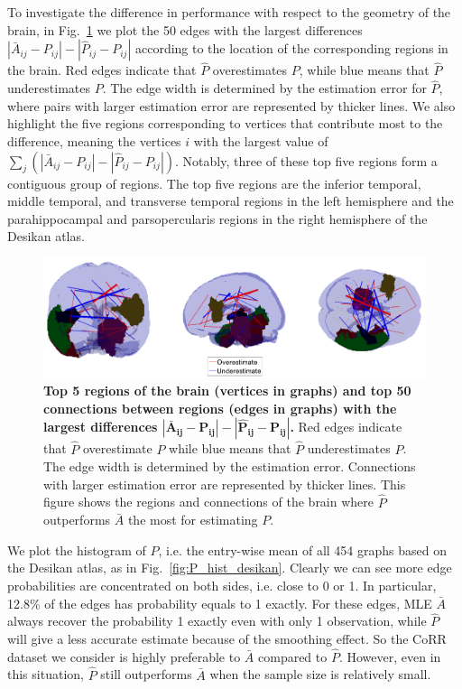 \documentclass[10pt,letterpaper]{article}
\renewcommand{\hat}{\widehat}
\begin{document}
To investigate the difference in performance with respect to the geometry of the brain, in Fig.~\ref{fig:Diff_between_desikan} we plot the 50 edges with the largest differences $|\bar{A}_{ij} - P_{ij}| - |\hat{P}_{ij} - P_{ij}|$ according to the location of the corresponding regions in the brain. Red edges indicate that $\hat{P}$ overestimates $P$, while blue means that $\hat{P}$ underestimates $P$. The edge width is determined by the estimation error for $\hat{P}$, where pairs with larger estimation error are represented by thicker lines.
We also highlight the five regions corresponding to vertices that contribute most to the difference, meaning the vertices $i$ with the largest value of $\sum_j (|\bar{A}_{ij} - P_{ij}| - |\hat{P}_{ij} - P_{ij}|)$.
Notably, three of these top five regions form a contiguous group of regions.
The top five regions are the inferior temporal, middle temporal, and transverse temporal regions in the left hemisphere and the parahippocampal and parsopercularis regions in the right hemisphere of the Desikan atlas.

\begin{figure}[!htbp]
\centering
\includegraphics[width=1\textwidth]{Diff_between_desikan.png}
\caption{{\bf Top 5 regions of the brain (vertices in graphs) and top 50 connections between regions (edges in graphs) with the largest differences $\bm{|\bar{A}_{ij} - P_{ij}| - |\hat{P}_{ij} - P_{ij}|}$.}
Red edges indicate that $\hat{P}$ overestimate $P$ while blue means that $\hat{P}$ underestimates $P$. The edge width is determined by the estimation error. Connections with larger estimation error are represented by thicker lines. This figure shows the regions and connections of the brain where $\hat{P}$ outperforms $\bar{A}$ the most for estimating $P$.}
\label{fig:Diff_between_desikan}
\end{figure}

We plot the histogram of $P$, i.e. the entry-wise mean of all 454 graphs based on the Desikan atlas, as in Fig.~\ref{fig:P_hist_desikan}. Clearly we can see more edge probabilities are concentrated on both sides, i.e. close to 0 or 1. In particular, 12.8\% of the edges has probability equals to 1 exactly. For these edges, MLE $\bar{A}$ always recover the probability 1 exactly even with only 1 observation, while $\hat{P}$ will give a less accurate estimate because of the smoothing effect. So the CoRR dataset we consider is highly preferable to $\bar{A}$ compared to $\hat{P}$. However, even in this situation, $\hat{P}$ still outperforms $\bar{A}$ when the sample size is relatively small.
\end{document}
